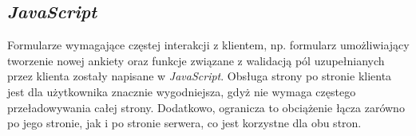 \subsection{\textit{JavaScript}}
\label{Chapter63c}

Formularze wymagające częstej interakcji z klientem, np. formularz umożliwiający tworzenie nowej ankiety oraz funkcje związane z walidacją pól uzupełnianych przez klienta zostały napisane w \textit{JavaScript}. Obsługa strony po stronie klienta jest dla użytkownika znacznie wygodniejsza, gdyż nie wymaga częstego przeładowywania całej strony. Dodatkowo, ogranicza to obciążenie łącza zarówno po jego stronie, jak i po stronie serwera, co jest korzystne dla obu stron.